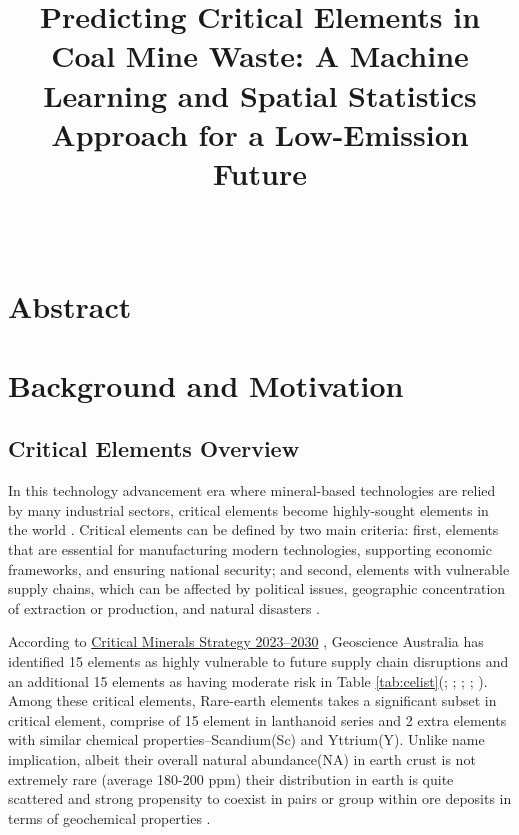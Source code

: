 \documentclass[11pt,a4paper,]{article}
\title{Predicting Critical Elements in Coal Mine Waste: A Machine Learning and Spatial Statistics Approach for a Low-Emission Future}
\author{\sf{\Large\textbf{Yuhao Long}\\\large Master of Business Analytics\newline 33412448 \newline \href{mailto:ylon0012@student.monash.edu}{\nolinkurl{ylon0012@student.monash.edu}}\\[0.5cm]}{\Large\textbf{Evan Ginting}\\\large Master of Business Analytics\newline 33477558 \newline \href{mailto:egin0003@student.monash.edu}{\nolinkurl{egin0003@student.monash.edu}}\\[0.5cm]}}
\date{\sf\Date~\Month~\Year}
\makeatletter
\def\titlepage{\front{\expandafter{\@title}}{\@author}{\@organization}}
\makeatother
\begin{document}
\titlepage

{
\setcounter{tocdepth}{2}
\tableofcontents
}
\newpage

\hypertarget{abstract}{%
\section{Abstract}\label{abstract}}

\hypertarget{background-and-motivation}{%
\section{Background and Motivation}\label{background-and-motivation}}

\hypertarget{critical-elements-overview}{%
\subsection{Critical Elements Overview}\label{critical-elements-overview}}

In this technology advancement era where mineral-based technologies are relied by many industrial sectors, critical elements become highly-sought elements in the world \autocite{Emsbo2021}. Critical elements can be defined by two main criteria: first, elements that are essential for manufacturing modern technologies, supporting economic frameworks, and ensuring national security; and second, elements with vulnerable supply chains, which can be affected by political issues, geographic concentration of extraction or production, and natural disasters \autocite{Lian2024,Fortier2018,DISR2023}.

According to \href{https://www.industry.gov.au/publications/critical-minerals-strategy-2023-2030}{Critical Minerals Strategy 2023--2030} \autocite{geoscience2023}, Geoscience Australia has identified 15 elements as highly vulnerable to future supply chain disruptions and an additional 15 elements as having moderate risk in Table \ref{tab:celist}(\autocite{Coyne2023}; \autocite{Skirrow2013}; \autocite{IEA2024b}; \autocite{Fortier2018}; \autocite{Austrade2024}). Among these critical elements, Rare-earth elements takes a significant subset in critical element, comprise of 15 element in lanthanoid series and 2 extra elements with similar chemical properties--Scandium(Sc) and Yttrium(Y). Unlike name implication, albeit their overall natural abundance(NA) in earth crust is not extremely rare (average 180-200 ppm) their distribution in earth is quite scattered and strong propensity to coexist in pairs or group within ore deposits in terms of geochemical properties \autocite{Zhou2017}.
\end{document}
